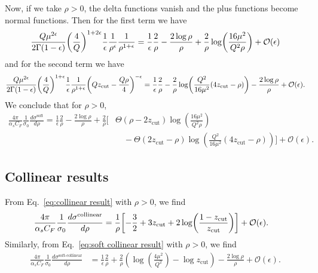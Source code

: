 \documentclass[11pt,twoside,reqno]{amsart}
\theoremstyle{plain}
\theoremstyle{remark}
\theoremstyle{definition}
\theoremstyle{remark}
\theoremstyle{definition}
\theoremstyle{definition}
\newcommand{\cO}{\mathcal{O}}
\newcommand{\zcut}{z_\mathrm{cut}}
\begin{document}
	Now, if we take $\rho > 0$, the delta functions vanish and the plus functions become normal functions. Then for the first term we have
	\begin{equation}
	\begin{aligned}
		\frac{Q \mu^{2\epsilon}}{2\Gamma(1 - \epsilon)} \qty(\frac{4}{Q})^{1 + 2\epsilon} \frac{1}{\epsilon} \frac{1}{\rho^\epsilon}\frac{1}{\rho^{1+\epsilon}} = \frac{1}{\epsilon}\frac{2}{\rho} - \frac{2\log \rho}{\rho} + \frac{2}{\rho}\log(\frac{16\mu^2}{Q^2\rho}) + \cO(\epsilon)
	\end{aligned}
	\end{equation}
	and for the second term we have
	\begin{equation}
	\begin{aligned}
		\frac{Q \mu^{2\epsilon}}{2\Gamma(1 - \epsilon)} \qty(\frac{4}{Q})^{1 + \epsilon} \frac{1}{\epsilon} \frac{1}{\rho^{1+\epsilon}} \qty(Q \zcut - \frac{Q\rho}{4})^{-\epsilon} = \frac{1}{\epsilon}\frac{2}{\rho} - \frac{2}{\rho}\log(\frac{Q^2}{16\mu^2}(4\zcut - \rho)) - \frac{2\log \rho}{\rho} + \cO(\epsilon).
	\end{aligned}
	\end{equation}
	We conclude that for $\rho > 0$,
	\begin{equation}
	\begin{aligned}
		\frac{4\pi}{\alpha_s C_F}\frac{1}{\sigma_0} \frac{d\sigma^{\text{soft}}}{d\rho} = \frac{1}{\epsilon}\frac{2}{\rho} - \frac{2\log\rho}{\rho} + \frac{2}{\rho}\bigg[&\Theta(\rho - 2\zcut)\log(\frac{16\mu^2}{Q^2\rho}) \\
			&\quad- \Theta(2\zcut - \rho)\log(\frac{Q^2}{16\mu^2}(4\zcut - \rho))\bigg] + \cO(\epsilon).
	\end{aligned}
	\end{equation}

\subsection{Collinear results}

	From Eq.\ \ref{eq:collinear result} with $\rho > 0$, we find
	\begin{equation}
	\begin{aligned}
		\frac{4\pi}{\alpha_s C_F}\frac{1}{\sigma_0}\frac{d\sigma^\text{collinear}}{d\rho} 
		&= \frac{1}{\rho} \qty[-\frac{3}{2} + 3\zcut + 2\log(\frac{1 - \zcut}{\zcut}) ] + \cO(\epsilon).
	\end{aligned}
	\end{equation}
	Similarly, from Eq.\ \ref{eq:soft collinear result} with $\rho > 0$, we find
	\begin{equation}
	\begin{aligned}
		\frac{4\pi}{\alpha_s C_F}\frac{1}{\sigma_0} \frac{d\sigma^\text{soft-collinear}}{d\rho} &= \frac{1}{\epsilon}\frac{2}{\rho} + \frac{2}{\rho} \left(\log \left(\frac{4 \mu ^2}{Q^2}\right)-\log\zcut\right) - \frac{2\log\rho}{\rho} + \cO(\epsilon).
	\end{aligned}
	\end{equation}
\end{document}
